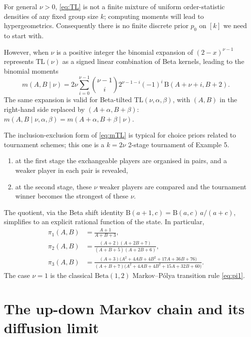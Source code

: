 \documentclass[11pt,reqno]{amsart}
\theoremstyle{definition}
\theoremstyle{remark}
\numberwithin{equation}{section}
\begin{document}
For general \(\nu>0\), \eqref{eq:TL} is not a finite mixture of uniform order-statistic densities of any fixed group size \(k\); computing moments will lead to hypergeometrics. Consequently there is no finite discrete prior \(p_0\) on \([k]\) we need to start with.

However, when \(\nu\) is a positive integer the binomial expansion of \((2-x)^{\nu-1}\) represents \(\mathrm{TL}(\nu)\) as a signed linear combination of Beta kernels, leading to the binomial moments
\begin{equation}\label{eq:mTL}
m(A,B\mid\nu)=2\nu\sum_{i=0}^{\nu-1}\binom{\nu-1}{i}2^{\nu-1-i}(-1)^i\,\mathrm{B}(A+\nu+i,B+2).
\end{equation}
The same expansion is valid for Beta-tilted \(\mathrm{TL}(\nu,\alpha,\beta)\), with \((A,B)\) in the right-hand side replaced by \((A+\alpha,B+\beta)\): \(m(A,B\mid\nu,\alpha,\beta)=m(A+\alpha,B+\beta\mid\nu)\).

The inclusion-exclusion form of \eqref{eq:mTL} is typical for choice priors related to tournament schemes; this one is a \(k=2\nu\) 2-stage tournament of Example 5.

\begin{enumerate}[label=(\roman*)]
\item at the first stage the exchangeable players are organised in pairs, and a weaker player in each pair is revealed,
\item at the second stage, these \(\nu\) weaker players are compared and the tournament winner becomes the strongest of these \(\nu\).
\end{enumerate}

The quotient, via the Beta shift identity \(\mathrm{B}(a+1,c)=\mathrm{B}(a,c)\,a/(a+c)\), simplifies to an explicit rational function of the state. In particular,
\begin{align}
\pi_1(A,B)&=\frac{A+1}{A+B+3},\label{eq:pi1}\\
\pi_2(A,B)&=\frac{(A+2)(A+2B+7)}{(A+B+5)(A+2B+6)},\label{eq:pi2}\\
\pi_3(A,B)&=\frac{(A+3)\bigl(A^2+4AB+4B^2+17A+36B+76\bigr)}{(A+B+7)\bigl(A^2+4AB+4B^2+15A+32B+60\bigr)}.\label{eq:pi3}
\end{align}
The case \(\nu=1\) is the classical \(\mathrm{Beta}(1,2)\) Markov--P\'olya transition rule \eqref{eq:pi1}.

\section{The up-down Markov chain and its diffusion limit}
\end{document}
